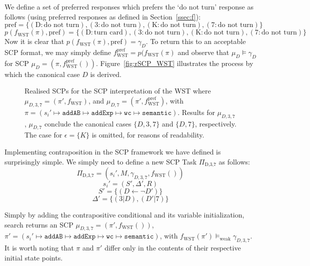 We define a set of preferred responses which prefers the `do not turn' response as follows (using preferred responses as defined in Section~\ref{ssec:f}):
\[
\text{pref}=\{(\text{D}:\text{do not turn}),(\text{3}:\text{do not turn}),(\text{K}:\text{do not turn}),(\text{7}:\text{do not turn})\}
\]
\[
p(f_\text{WST}(\pi),\text{pref})=\{(\text{D}:\text{turn card}),(\text{3}:\text{do not turn}),(\text{K}:\text{do not turn}),(\text{7}:\text{do not turn})\}
\]
Now it is clear that $p(f_\text{WST}(\pi),\text{pref})= \gamma_D$. To return this to an acceptable SCP format, we may simply define $f_\text{WST}^\text{pref}=p(f_\text{WST}(\pi)$ and observe that $\mu_D \models \gamma_D$ for SCP $\mu_D=(\pi, f_\text{WST}^\text{pref}())$. Figure~\ref{fig:rSCP_WST} illustrates the process by which the canonical case $D$ is derived.


\begin{sidewaysfigure}

\caption{Realised SCPs for the SCP interpretation of the WST where $\mu_{D,3,7}=(\pi',f_\text{WST})$, and $\mu_{D,7}=(\pi',f_\text{WST}^\text{pref})$, with $\pi=(s_i' \longmapsto \texttt{addAB} \longmapsto \texttt{addExp}  \longmapsto \texttt{wc} \longmapsto \texttt{semantic})$.  Results for $\mu_{D,3,7}$, $\mu_{D,7}$ conclude the canonical cases $\{D,3,7\}$ and $\{D,7\}$, respectively. The case for $\epsilon=\{K\}$ is omitted, for reasons of readability.}
\label{fig:realisedSCPsWST_mod}
\end{sidewaysfigure}


Implementing contraposition in the SCP framework we have defined is surprisingly simple. We simply need to define a new SCP Task $\Pi_\text{D,3,7}$ as follows:
\[
\Pi_\text{D,3,7} = (s_i', M, \gamma_{D,3,7}, f_\text{WST}())
\]
\[
s_i'=(S', \Delta', R)
\]
\[
S'=\{(D \leftarrow \lnot D')\}
\]
\[
\Delta'=\{(3|D),(D'|7)\}
\]

Simply by adding the contrapositive conditional and its variable initialization, search returns an SCP $\mu_{D,3,7}=(\pi', f_\text{WST}())$, $\pi'=(s_i' \longmapsto \texttt{addAB} \longmapsto \texttt{addExp} \longmapsto \texttt{wc} \longmapsto \texttt{semantic})$, with $f_\text{WST}(\pi')\models_\text{weak} \gamma_{D,3,7}$. It is worth noting that $\pi$ and $\pi'$ differ only in the contents of their respective initial state points.


